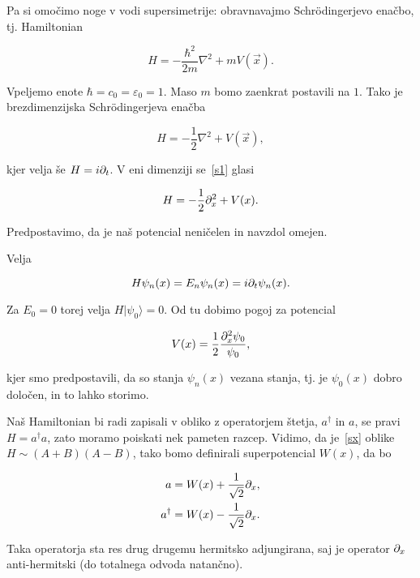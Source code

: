 Pa si omo\v cimo noge v vodi supersimetrije: obravnavajmo Schr\" odingerjevo ena\v cbo, tj. Hamiltonian

\begin{equation}
	H = -\frac{\hbar^2}{2m}\nabla^2 + mV(\vec{x}).
	\label{schroedinger}
\end{equation}

Vpeljemo enote $\hbar = c_0 = \varepsilon_0 = 1$. Maso $m$ bomo zaenkrat postavili na $1$. Tako je brezdimenzijska
Schr\" odingerjeva ena\v cba

\begin{equation}
	H = -\frac{1}{2}\nabla^2 + V(\vec{x}),
	\label{s1}
\end{equation}

kjer velja \v se $H = i\partial_t$. V eni dimenziji se~\eqref{s1} glasi

\begin{equation}
	H = -\frac{1}{2}\partial_x^2 + V(x).
	\label{sx}
\end{equation}

Predpostavimo, da je na\v s potencial neni\v celen in navzdol omejen.

Velja

\begin{equation}
	H\psi_n(x) = E_n\psi_n(x) = i\partial_t\psi_n(x).
\end{equation}

Za $E_0 = 0$ torej velja $H|\psi_0\rangle = 0$. Od tu dobimo pogoj za potencial

\begin{equation}
	V(x) = \frac{1}{2}\frac{\partial_x^2\psi_0}{\psi_0},
	\label{vpogoj}
\end{equation}

kjer smo predpostavili, da so stanja $\psi_n(x)$ vezana stanja, tj. je $\psi_0(x)$ dobro dolo\v cen, in
to lahko storimo.

Na\v s Hamiltonian bi radi zapisali v obliko z operatorjem \v stetja, $a^\dagger$ in $a$, se pravi
$H = a^\dagger a$, zato moramo poiskati nek pameten razcep. Vidimo, da je~\eqref{sx} oblike
$H \sim (A + B)(A - B)$, tako bomo definirali superpotencial $W(x)$, da bo

\begin{align}
	a &= W(x) + \frac{1}{\sqrt{2}}\partial_x,          \label{anihilator} \\
	a^\dagger &= W(x) - \frac{1}{\sqrt{2}}\partial_x.  \label{kreator}
\end{align}

Taka operatorja sta res drug drugemu hermitsko adjungirana, saj je operator $\partial_x$ anti-hermitski (do totalnega
odvoda natan\v cno).

